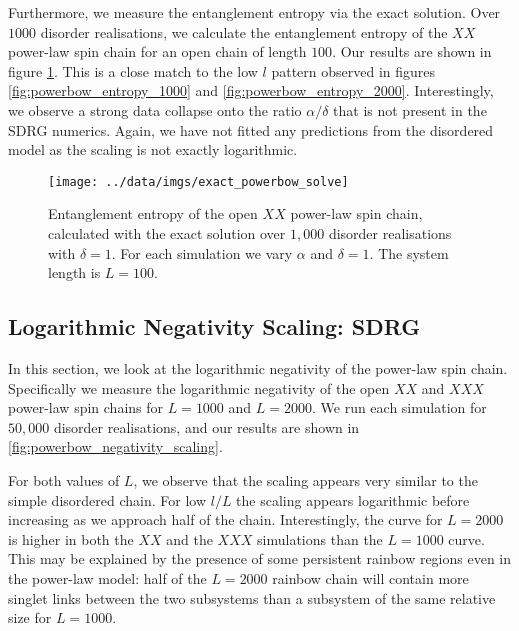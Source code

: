 Furthermore, we measure the entanglement entropy via the exact solution. Over $1000$ disorder realisations, we calculate the entanglement entropy of the $XX$ power-law spin chain for an open chain of length $100$. Our results are shown in figure \ref{fig:powerbow_entropy_exact}. This is a close match to the low $l$ pattern observed in figures \ref{fig:powerbow_entropy_1000} and \ref{fig:powerbow_entropy_2000}. Interestingly, we observe a strong data collapse onto the ratio $\alpha / \delta$ that is not present in the SDRG numerics. Again, we have not fitted any predictions from the disordered model as the scaling is not exactly logarithmic. 

\begin{figure}[h]
    \centering
    \texttt{[image: ../data/imgs/exact\_powerbow\_solve]}
    \caption{Entanglement entropy of the open $XX$ power-law spin chain, calculated with the exact solution over $1,000$ disorder realisations with $\delta = 1$. For each simulation we vary $\alpha$ and $\delta = 1$. The system length is $L = 100$.}
    \label{fig:powerbow_entropy_exact}
\end{figure}


\subsection{Logarithmic Negativity Scaling: SDRG}\label{subsec:powerbow_negativity}
In this section, we look at the logarithmic negativity of the power-law spin chain. Specifically we measure the logarithmic negativity of the open $XX$ and $XXX$ power-law spin chains for $L = 1000$ and $L = 2000$. We run each simulation for $50,000$ disorder realisations, and our results are shown in \ref{fig:powerbow_negativity_scaling}.

For both values of $L$, we observe that the scaling appears very similar to the simple disordered chain. For low $l/L$ the scaling appears logarithmic before increasing as we approach half of the chain. Interestingly, the curve for $L = 2000$ is higher in both the $XX$ and the $XXX$ simulations than the $L = 1000$ curve. This may be explained by the presence of some persistent rainbow regions even in the power-law model: half of the $L = 2000$ rainbow chain will contain more singlet links between the two subsystems than a subsystem of the same relative size for $L = 1000$.

